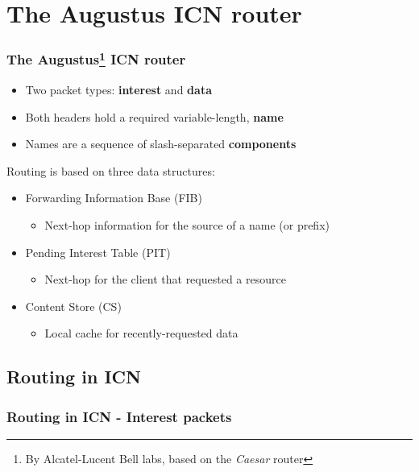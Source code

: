 \section{The Augustus ICN router}

\begin{frame}[fragile]
  \frametitle{The Augustus\footnote{By Alcatel-Lucent Bell labs, based on the \textit{Caesar} \cite{caesar} router} ICN router}
  \pause
  \begin{itemize}
    \item Two packet types: \textbf{interest} and \textbf{data} \textrm{} \cite{icn-packet}
    \item Both headers hold a required variable-length, \textbf{name}
    \item Names are a sequence of slash-separated \textbf{components}
  \end{itemize}
  \pause
  Routing is based on three data structures:
  \pause
  \begin{itemize}
    \item
      Forwarding Information Base (FIB)
      \begin{itemize}
        \item Next-hop information for the source of a name (or prefix)
      \end{itemize}
      \pause
    \item
      Pending Interest Table (PIT)
      \begin{itemize}
        \item Next-hop for the client that requested a resource
      \end{itemize}
      \pause
    \item
      Content Store (CS)
      \begin{itemize}
        \item Local cache for recently-requested data
      \end{itemize}
  \end{itemize}
\end{frame}

\subsection{Routing in ICN}
\begin{frame}[fragile]
  \frametitle{Routing in ICN - Interest packets}
  \begin{algorithm}[H]
    \DontPrintSemicolon
    
  \end{algorithm}
\end{frame}

